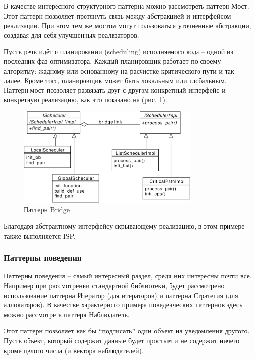 \documentclass[a4paper,12pt,oneside]{article}
\begin{document}
В качестве интересного структурного паттерна можно рассмотреть паттерн Мост. Этот паттерн позволяет протянуть связь между абстракцией и интерфейсом реализации. При этом тем же мостом могут пользоваться уточненные абстракции, создавая для себя улучшенных реализаторов.

Пусть речь идёт о планировании (scheduling) исполняемого кода -- одной из последних фаз оптимизатора. Каждый планировщик работает по своему алгоритму: жадному или основанному на расчистке критического пути и так далее. Кроме того, планировщик может быть локальным или глобальным. Паттерн мост позволяет развязать друг с другом конкретный интерфейс и конкретную реализацию, как это показано на (рис. \ref{fig:bridge_pattern}).

\begin{figure}[h!]
\centering
\includegraphics[width=0.8\textwidth]{illustrations/sched-bridge-crop.pdf}
\caption{Паттерн Bridge}
\label{fig:bridge_pattern}
\end{figure}

Благодаря абстрактному интерфейсу скрывающему реализацию, в этом примере также выполняется ISP.

\subsubsection{Паттерны поведения}

Паттерны поведения -- самый интересный раздел, среди них интересны почти все. Например при рассмотрении стандартной библиотеки, будет рассмотрено использование паттерна Итератор (для итераторов) и паттерна Стратегия (для аллокаторов). В качестве характерного примера поведенческих паттернов здесь можно рассмотреть паттерн Наблюдатель.

Этот паттерн позволяет как бы ``подписать'' один объект на уведомления другого. Пусть объект, который содержит данные будет простым и не содержит ничего кроме целого числа (и вектора наблюдателей).
\end{document}
